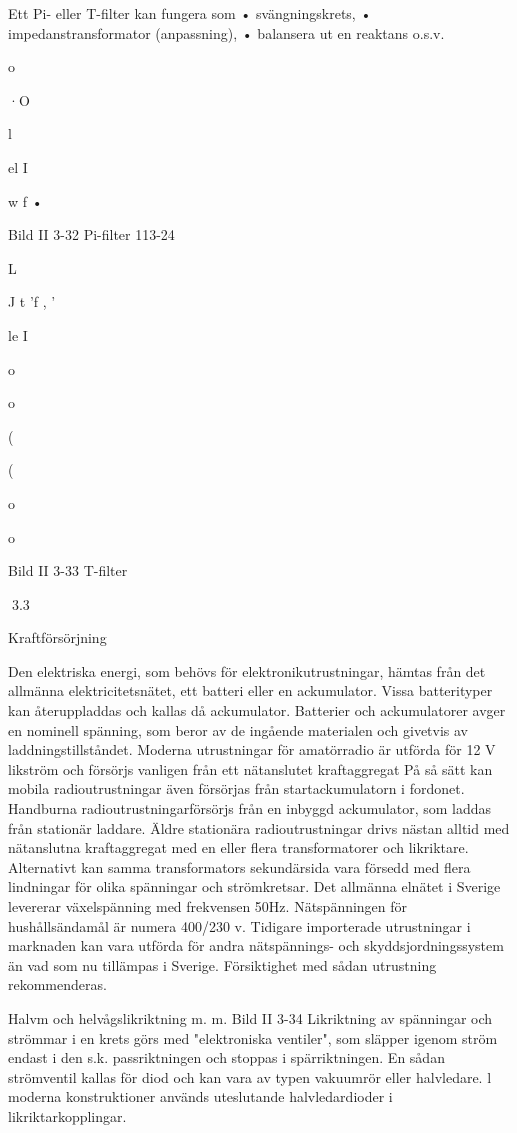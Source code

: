\documentclass[a4paper,twoside,twocolumn,openright]{book}
\begin{document}
{{{{{{{Ett Pi- eller T-filter kan fungera som
• svängningskrets,
• impedanstransformator (anpassning),
• balansera ut en reaktans o.s.v.

o

·O

l

el
I

w f •

Bild II 3-32 Pi-filter
113-24

L

J t 'f , '

le
I

o

o

(

(

o

o

Bild II 3-33 T-filter

3.3

Kraftförsörjning

Den elektriska energi, som behövs för elektronikutrustningar, hämtas från det allmänna elektricitetsnätet, ett batteri eller en ackumulator. Vissa batterityper kan återuppladdas och kallas då ackumulator.
Batterier och ackumulatorer avger en
nominell spänning, som beror av de ingående materialen och givetvis av laddningstillståndet. Moderna utrustningar för amatörradio är utförda för 12 V likström och försörjs
vanligen från ett nätanslutet kraftaggregat
På så sätt kan mobila radioutrustningar även
försörjas från startackumulatorn i fordonet.
Handburna radioutrustningarförsörjs från
en inbyggd ackumulator, som laddas från
stationär laddare.
Äldre stationära radioutrustningar drivs
nästan alltid med nätanslutna kraftaggregat
med en eller flera transformatorer och likriktare. Alternativt kan samma transformators
sekundärsida vara försedd med flera lindningar för olika spänningar och strömkretsar.
Det allmänna elnätet i Sverige levererar
växelspänning med frekvensen 50Hz. Nätspänningen för hushållsändamål är numera
400/230 v.
Tidigare importerade utrustningar i marknaden kan vara utförda för andra nätspännings- och skyddsjordningssystem än vad
som nu tillämpas i Sverige. Försiktighet med
sådan utrustning rekommenderas.

Halvm och helvågslikriktning m. m.
Bild II 3-34
Likriktning av spänningar och strömmar i en
krets görs med "elektroniska ventiler", som
släpper igenom ström endast i den s.k. passriktningen och stoppas i spärriktningen. En
sådan strömventil kallas för diod och kan
vara av typen vakuumrör eller halvledare. l
moderna konstruktioner används uteslutande halvledardioder i likriktarkopplingar.

}}}}}}}
\end{document}
